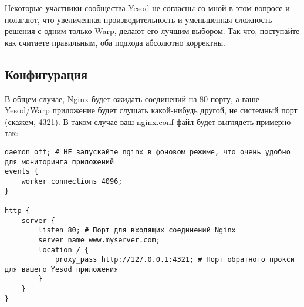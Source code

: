 
Некоторые участники сообщества Yesod не согласны со мной в этом вопросе и полагают, что увеличенная производительность и уменьшенная сложность решения с одним только Warp, делают его лучшим выбором. Так что, поступайте как считаете правильным, оба подхода абсолютно корректны.

%
\subsection{Конфигурация}
%
%
В общем случае, Nginx будет ожидать соединений на 80 порту, а ваше Yesod/Warp приложение будет слушать какой-нибудь другой, не системный порт (скажем, 4321). В таком случае ваш nginx.conf файл будет выглядеть примерно так:

%
%
\begin{lstlisting}
daemon off; # НЕ запускайте nginx в фоновом режиме, что очень удобно для мониторинга приложений
events {
    worker_connections 4096;
}

http {
    server {
        listen 80; # Порт для входящих соединений Nginx
        server_name www.myserver.com;
        location / {
            proxy_pass http://127.0.0.1:4321; # Порт обратного прокси для вашего Yesod приложения
        }
    }
}
\end{lstlisting}
%

